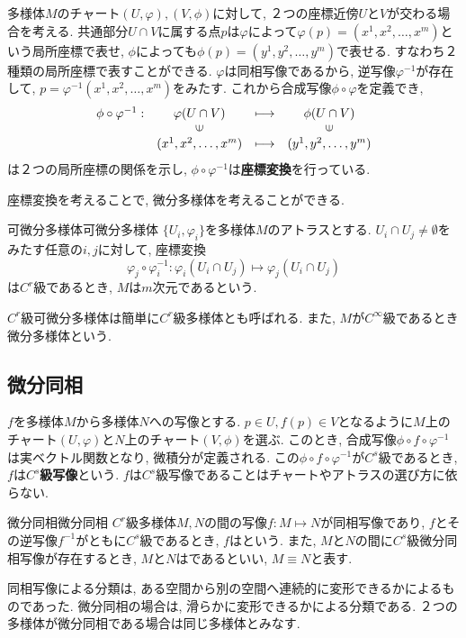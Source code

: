 \documentclass[../main]{subfiles}
\begin{document}
        多様体$M$のチャート$(U,\varphi),(V,\phi)$に対して, ２つの座標近傍$U$と$V$が交わる場合を考える. 共通部分$U \cap V$に属する点$p$は$\varphi$によって$\varphi(p)=(x^1,x^2,\ldots,x^m)$という局所座標で表せ, $\phi$によっても$\phi(p)=(y^1,y^2,\ldots,y^m)$で表せる. すなわち２種類の局所座標で表すことができる.  $\varphi$は同相写像であるから, 逆写像$\varphi^{-1}$が存在して, $p=\varphi^{-1}(x^1,x^2,\ldots,x^m)$をみたす. これから合成写像$\phi\circ\varphi$を定義でき, 
        \begin{equation}
            \begin{array}{cccc}
                \phi\circ\varphi^{-1}:
                    &\varphi(U \cap V) & \longmapsto & \phi(U \cap V) \\
                    & \rotatebox{90}{$\in$} & & \rotatebox{90}{$\in$} \\
                    &(x^1,x^2,\ldots,x^m) &\longmapsto & (y^1,y^2,\ldots,y^m)
            \end{array}
        \end{equation}
        は２つの局所座標の関係を示し, $\phi\circ\varphi^{-1}$は\textbf{座標変換}を行っている. 
        
        座標変換を考えることで, 微分多様体を考えることができる. 
        \begin{dfn}{可微分多様体}{可微分多様体}
            $\{U_i,\varphi_i\}$を多様体$M$のアトラスとする. $U_i \cap U_j \ne \emptyset$をみたす任意の$i,j$に対して, 座標変換
            \begin{equation}
                \varphi_j\circ\varphi_i^{-1}: \varphi_i(U_i \cap U_j) \mapsto \varphi_j(U_i \cap U_j)
            \end{equation}
            は$C^r$級であるとき, $M$は$m$次元であるという. 
        \end{dfn}
        $C^r$級可微分多様体は簡単に$C^r$級多様体とも呼ばれる.
        また, $M$が$C^\infty$級であるとき微分多様体という. 
        
    \subsection{微分同相}
        $f$を多様体$M$から多様体$N$への写像とする. $p \in U,f(p) \in V$となるように$M$上のチャート$(U,\varphi)$と$N$上のチャート$(V,\phi)$を選ぶ. このとき, 合成写像$\phi \circ f \circ \varphi^{-1}$は実ベクトル関数となり, 微積分が定義される. この$\phi \circ f \circ \varphi^{-1}$が$C^s$級であるとき, $f$は\textbf{$C^s$級写像}という. $f$は$C^s$級写像であることはチャートやアトラスの選び方に依らない. 
        \begin{dfn}{微分同相}{微分同相}
            $C^r$級多様体$M,N$の間の写像$f:M \mapsto N$が同相写像であり, $f$とその逆写像$f^{-1}$がともに$C^s$級であるとき, $f$はという. また, $M$と$N$の間に$C^s$級微分同相写像が存在するとき, $M$と$N$はであるといい, $M \equiv N$と表す.
        \end{dfn}
        同相写像による分類は, ある空間から別の空間へ連続的に変形できるかによるものであった. 微分同相の場合は, 滑らかに変形できるかによる分類である. ２つの多様体が微分同相である場合は同じ多様体とみなす. 
        
\end{document}
